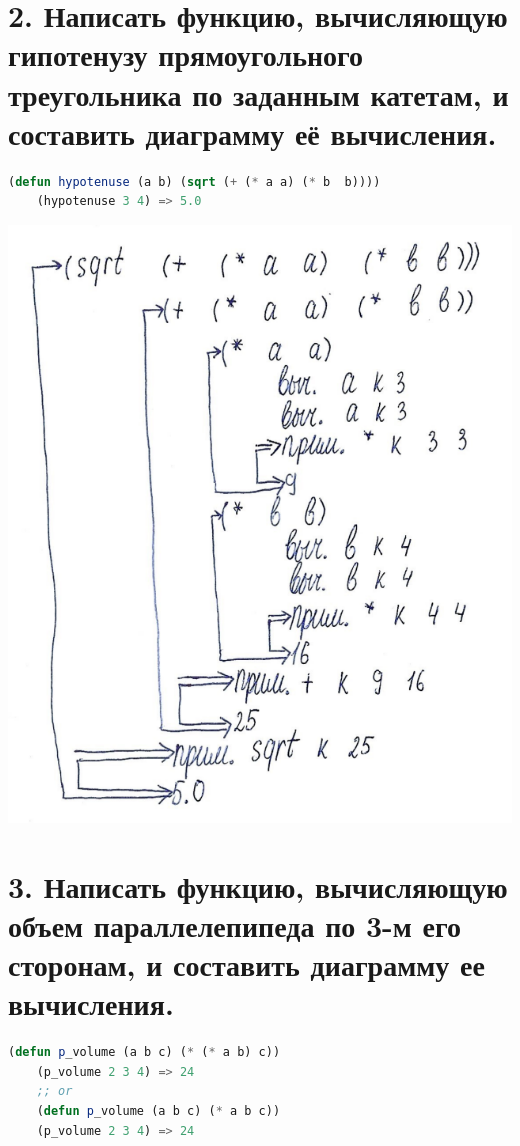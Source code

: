 \documentclass[12pt]{report}
\begin{document}
\clearpage
\section*{2. Написать функцию, вычисляющую гипотенузу прямоугольного треугольника по заданным катетам, и составить диаграмму её вычисления.}

\begin{lstlisting}[language=Lisp]
	(defun hypotenuse (a b) (sqrt (+ (* a a) (* b  b))))
	(hypotenuse 3 4) => 5.0 
\end{lstlisting}

\includegraphics[scale=1]{img/2}

\clearpage
\section*{3. Написать функцию, вычисляющую объем параллелепипеда по 3-м его сторонам, и составить диаграмму ее вычисления.}

\begin{lstlisting}[language=Lisp]
	 (defun p_volume (a b c) (* (* a b) c))
	(p_volume 2 3 4) => 24 
	;; or
	(defun p_volume (a b c) (* a b c))
	(p_volume 2 3 4) => 24 
\end{lstlisting}
\end{document}
